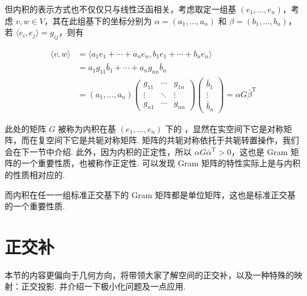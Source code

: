 但内积的表示方式也不仅仅只与线性泛函相关，考虑取定一组基 $ (e_1, \ldots , e_n) $，考虑 $ v, w \in V $，其在此组基下的坐标分别为 $ \alpha = (a_1, \ldots , a_n) $ 和 $ \beta = (b_1, \ldots , b_n) $，若 $ \langle e_i, e_j \rangle = g_{ij} $，则有

\begin{align*}
    \langle v, w \rangle & = \langle a_1e_1 + \cdots + a_ne_n, b_1e_1 + \cdots + b_ne_n \rangle \\
                         & = a_1g_{11}\bar{b}_1 + \cdots + a_ng_{nn}\bar{b}_n                   \\
                         & = (a_1, \ldots, a_n) \begin{pmatrix}
                                                    g_{11} & \cdots & g_{1n} \\
                                                    \vdots & \ddots & \vdots \\
                                                    g_{n1} & \cdots & g_{nn}
                                                \end{pmatrix} \begin{pmatrix}
                                                                  \bar{b}_1 \\
                                                                  \vdots    \\
                                                                  \bar{b}_n
                                                              \end{pmatrix}
    = \alpha G \bar{\beta}^{\mathrm{T}}
\end{align*}

此处的矩阵 $ G $ 被称为内积在基 $ (e_1, \ldots, e_n) $ 下的 ，显然在实空间下它是对称矩阵，而在复空间下它是共轭对称矩阵. 矩阵的共轭对称依托于共轭转置操作，我们会在下一节中介绍. 此外，因为内积的正定性，所以 $ \alpha G \bar{\alpha}^{\mathrm{T}} > 0$，这也是 Gram 矩阵的一个重要性质，也被称作正定性. 可以发现 Gram 矩阵的特性实际上是与内积的性质相对应的.

而内积在任一一组标准正交基下的 Gram 矩阵都是单位矩阵，这也是标准正交基的一个重要性质.

\section{正交补}

本节的内容更偏向于几何方向，将带领大家了解空间的正交补，以及一种特殊的映射：正交投影. 并介绍一下极小化问题及一点应用.

